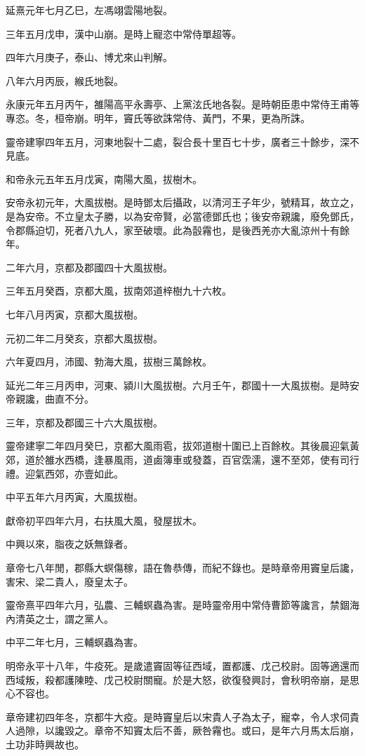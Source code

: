 \begin{pinyinscope}
延熹元年七月乙巳，左馮翊雲陽地裂。

三年五月戊申，漢中山崩。是時上寵恣中常侍單超等。

四年六月庚子，泰山、博尤來山判解。

八年六月丙辰，緱氏地裂。

永康元年五月丙午，雒陽高平永壽亭、上黨泫氏地各裂。是時朝臣患中常侍王甫等專恣。冬，桓帝崩。明年，竇氏等欲誅常侍、黃門，不果，更為所誅。

靈帝建寧四年五月，河東地裂十二處，裂合長十里百七十步，廣者三十餘步，深不見底。

和帝永元五年五月戊寅，南陽大風，拔樹木。

安帝永初元年，大風拔樹。是時鄧太后攝政，以清河王子年少，號精耳，故立之，是為安帝。不立皇太子勝，以為安帝賢，必當德鄧氏也；後安帝親讒，廢免鄧氏，令郡縣迫切，死者八九人，家至破壞。此為瞉霿也，是後西羌亦大亂涼州十有餘年。

二年六月，京都及郡國四十大風拔樹。

三年五月癸酉，京都大風，拔南郊道梓樹九十六枚。

七年八月丙寅，京都大風拔樹。

元初二年二月癸亥，京都大風拔樹。

六年夏四月，沛國、勃海大風，拔樹三萬餘枚。

延光二年三月丙申，河東、潁川大風拔樹。六月壬午，郡國十一大風拔樹。是時安帝親讒，曲直不分。

三年，京都及郡國三十六大風拔樹。

靈帝建寧二年四月癸巳，京都大風雨雹，拔郊道樹十圍已上百餘枚。其後晨迎氣黃郊，道於雒水西橋，逢暴風雨，道鹵簿車或發蓋，百官霑濡，還不至郊，使有司行禮。迎氣西郊，亦壹如此。

中平五年六月丙寅，大風拔樹。

獻帝初平四年六月，右扶風大風，發屋拔木。

中興以來，脂夜之妖無錄者。

章帝七八年閒，郡縣大螟傷稼，語在魯恭傳，而紀不錄也。是時章帝用竇皇后讒，害宋、梁二貴人，廢皇太子。

靈帝熹平四年六月，弘農、三輔螟蟲為害。是時靈帝用中常侍曹節等讒言，禁錮海內清英之士，謂之黨人。

中平二年七月，三輔螟蟲為害。

明帝永平十八年，牛疫死。是歲遣竇固等征西域，置都護、戊己校尉。固等適還而西域叛，殺都護陳睦、戊己校尉關寵。於是大怒，欲復發興討，會秋明帝崩，是思心不容也。

章帝建初四年冬，京都牛大疫。是時竇皇后以宋貴人子為太子，寵幸，令人求伺貴人過隙，以讒毀之。章帝不知竇太后不善，厥咎霿也。或曰，是年六月馬太后崩，土功非時興故也。


\end{pinyinscope}